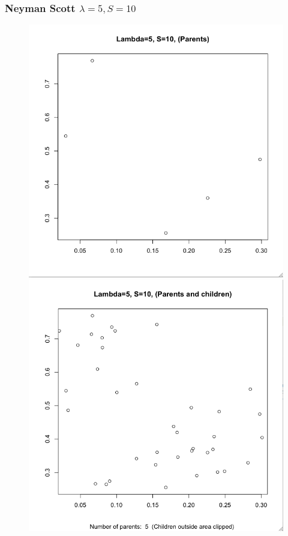 \documentclass[nototal,handout]{beamer}
\begin{document}
\begin{frame}
	\frametitle{Neyman Scott $\lambda=5, S=10$}
 \begin{figure}[ht]
  \begin{minipage}[b]{0.4\linewidth}
  \centering
  \includegraphics[scale=0.20]{ns510p.png}
  \end{minipage}
  \begin{minipage}[b]{0.4\linewidth}
  \centering
  \includegraphics[scale=0.20]{ns510c.png}
  \end{minipage}

  \end{figure}
 \end{frame} 
\end{document}
